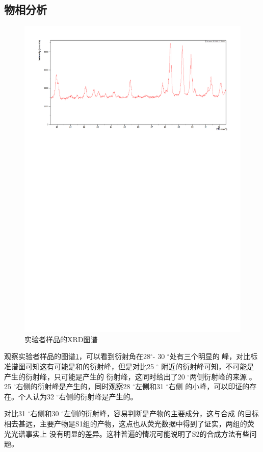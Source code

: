 \documentclass[a4paper,zihao=5,UTF8]{ctexart}
\def\degree{$^{\circ}$}
\begin{document}
	\subsection{物相分析}
	\begin{figure}[htbp]
		\centering
		\includegraphics[scale=0.60]{S2-1800011716.pdf}
		\caption{实验者样品的XRD图谱}
		\label{S2 XRD}
	\end{figure}
	观察实验者样品的图谱\ref{S2 XRD}，可以看到衍射角在28\degree - 30 \degree 处有三个明显的
	峰，对比标准谱图可知这有可能是和的衍射峰，但是对比25 \degree 
	附近的衍射峰可知，不可能是产生的衍射峰，只可能是产生的
	衍射峰，这同时给出了20 \degree 两侧衍射峰的来源
	。25 \degree 右侧的衍射峰是产生的，同时观察28 \degree 左侧和31 \degree 右侧
	的小峰，可以印证的存在。个人认为32 \degree 右侧的衍射峰是产生的。
	\par 
	对比31 \degree 右侧和30 \degree 左侧的衍射峰，容易判断是产物的主要成分，这与合成
	的目标相去甚远，主要产物是S1组的产物，这点也从荧光数据中得到了证实，两组的荧光光谱事实上
	没有明显的差异。这种普遍的情况可能说明了S2的合成方法有些问题。
\end{document}
